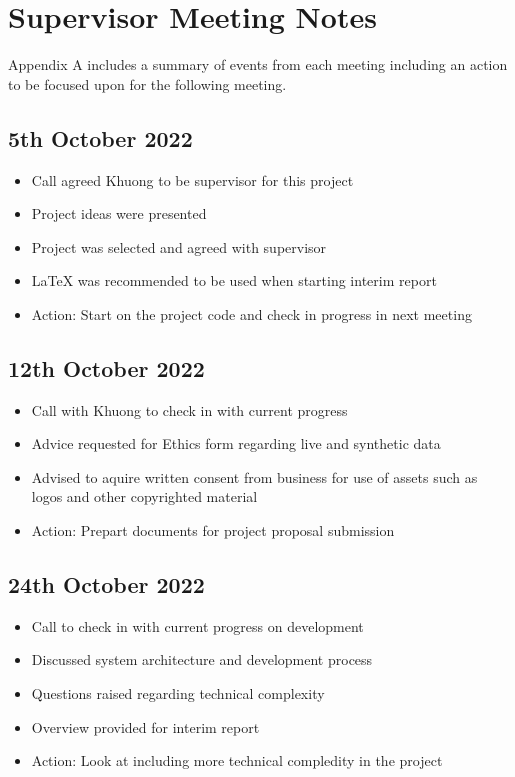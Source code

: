 
\chapter{Supervisor Meeting Notes} %

\label{AppendixB} %

Appendix A includes a summary of events from each meeting including an action to be focused upon for the following meeting.

\section{5th October 2022}
\begin{itemize}
    \item Call agreed Khuong to be supervisor for this project
    \item Project ideas were presented
    \item Project was selected and agreed with supervisor
    \item LaTeX was recommended to be used when starting interim report
    \item Action: Start on the project code and check in progress in next meeting
\end{itemize}

\section{12th October 2022}
\begin{itemize}
    \item Call with Khuong to check in with current progress
    \item Advice requested for Ethics form regarding live and synthetic data
    \item Advised to aquire written consent from business for use of assets such as logos and other copyrighted material
    \item Action: Prepart documents for project proposal submission
\end{itemize}

\section{24th October 2022}
\begin{itemize}
    \item Call to check in with current progress on development
    \item Discussed system architecture and development process
    \item Questions raised regarding technical complexity
    \item Overview provided for interim report
    \item Action: Look at including more technical compledity in the project
\end{itemize}

